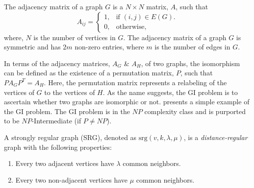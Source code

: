 \documentclass[twocolumn,a4paper,english,10pt]{article}
\begin{document}
\begin{definition}
    The adjacency matrix of a graph $G$ is a $N \times N$ matrix, $A$, such that
    \begin{equation*}
        A_{ij} = \begin{cases}
            1, & \text{if } (i,j) \in E(G). \\
            0, & \text{otherwise},
        \end{cases}
    \end{equation*}
    where, $N$ is the number of vertices in $G$. The adjacency matrix of a graph $G$ is
    symmetric and has $2m$ non-zero entries, where $m$ is the number of edges in $G$.
\end{definition}

In terms of the adjacency matrices, $A_G$ \& $A_H$, of two graphs, the isomorphism 
can be defined as the existence of a permutation matrix, $P$, such that $PA_GP^T = A_H$. Here, 
the permutation matrix represents a relabeling of the vertices of $G$ to the vertices of $H$. As 
the name suggests, the GI problem is to ascertain whether two graphs are isomorphic or not.  
presents a simple example of the GI problem. The GI problem is in the $NP$ complexity class and is 
purported to be $NP$-Intermediate (if $P \neq NP$).


\begin{definition}
    A strongly regular graph (SRG), denoted as $\text{srg}(v, k, \lambda, \mu)$, is a \textit{distance-regular} graph with the following properties:
    \begin{enumerate}
        \item Every two adjacent vertices have $\lambda$ common neighbors.
        \item Every two non-adjacent vertices have $\mu$ common neighbors.
    \end{enumerate}
\end{definition}

\end{document}
